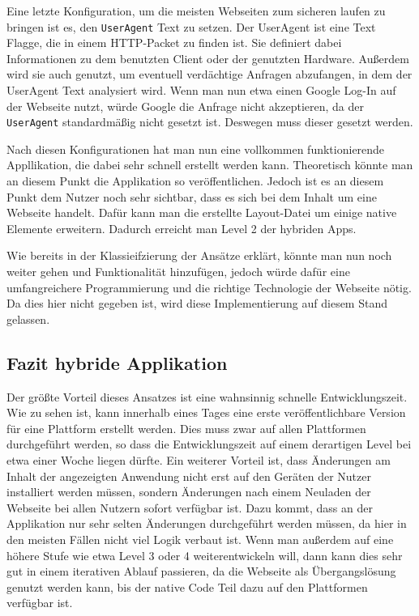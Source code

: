 Eine letzte Konfiguration, um die meisten Webseiten zum sicheren laufen zu bringen ist es, den \verb|UserAgent| Text zu setzen. Der UserAgent ist eine Text Flagge, die in einem HTTP-Packet zu finden ist. Sie definiert dabei Informationen zu dem benutzten Client oder der genutzten Hardware. Außerdem wird sie auch genutzt, um eventuell verdächtige Anfragen abzufangen, in dem der UserAgent Text analysiert wird\cite{UserAgentString}. Wenn man nun etwa einen Google Log-In auf der Webseite nutzt, würde Google die Anfrage nicht akzeptieren, da der \verb|UserAgent| standardmäßig nicht gesetzt ist. Deswegen muss dieser gesetzt werden.

Nach diesen Konfigurationen hat man nun eine vollkommen funktionierende Appllikation, die dabei sehr schnell erstellt werden kann. Theoretisch könnte man an diesem Punkt die Applikation so veröffentlichen. Jedoch ist es an diesem Punkt dem Nutzer noch sehr sichtbar, dass es sich bei dem Inhalt um eine Webseite handelt. Dafür kann man die erstellte Layout-Datei um einige native Elemente erweitern. Dadurch erreicht man Level 2 der hybriden Apps.

Wie bereits in der Klassieifzierung der Ansätze erklärt, könnte man nun noch weiter gehen und Funktionalität hinzufügen, jedoch würde dafür eine umfangreichere Programmierung und die richtige Technologie der Webseite nötig. Da dies hier nicht gegeben ist, wird diese Implementierung auf diesem Stand gelassen. 

\subsection{Fazit hybride Applikation}
Der größte Vorteil dieses Ansatzes ist eine wahnsinnig schnelle Entwicklungszeit. Wie zu sehen ist, kann innerhalb eines Tages eine erste veröffentlichbare Version für eine Plattform erstellt werden. Dies muss zwar auf allen Plattformen durchgeführt werden, so dass die Entwicklungszeit auf einem derartigen Level bei etwa einer Woche liegen dürfte. Ein weiterer Vorteil ist, dass Änderungen am Inhalt der angezeigten Anwendung nicht erst auf den Geräten der Nutzer installiert werden müssen, sondern Änderungen nach einem Neuladen der Webseite bei allen Nutzern sofort verfügbar ist. Dazu kommt, dass an der Applikation nur sehr selten Änderungen durchgeführt werden müssen, da hier in den meisten Fällen nicht viel Logik verbaut ist. Wenn man außerdem auf eine höhere Stufe wie etwa Level 3 oder 4 weiterentwickeln will, dann kann dies sehr gut in einem iterativen Ablauf passieren, da die Webseite als Übergangslösung genutzt werden kann, bis der native Code Teil dazu auf den Plattformen verfügbar ist.

